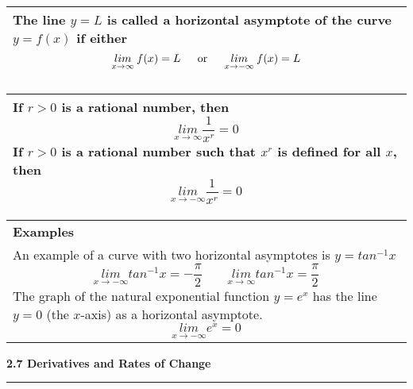 \documentclass[fleqn]{article}
\begin{document}
\begin{center}
\def\arraystretch{1.3}
{\setlength{\tabcolsep}{16pt}
\begin{tabularx}{.9\textwidth}{|X|}
\hline
	\vspace{1pt}
	The line $y = L$ is called a \textbf{horizontal asymptote} of the curve $y = f(x)$ if either
	$$\underset{x \to \infty}{lim} \: f(x) = L \text{\hspace{12pt} or \hspace{12pt}} \underset{x \to -\infty}{lim} \: f(x) = L$$
	\\
	\hline
\end{tabularx}}
\vspace{12pt}

\def\arraystretch{1.3}
{\setlength{\tabcolsep}{16pt}
\begin{tabularx}{.9\textwidth}{|X|}
\hline
	\vspace{1pt}
	If $r > 0$ is a rational number, then 
	$$\underset{x \to \infty}{lim} \dfrac{1}{x^r} = 0$$
	If $r > 0$ is a rational number such that $x^r$ is defined for all $x$, then
	$$\underset{x \to -\infty}{lim} \dfrac{1}{x^r} = 0$$	
	\\
	\hline
\end{tabularx}}
\vspace{12pt}

\def\arraystretch{1.3}
{\setlength{\tabcolsep}{16pt}
\begin{tabularx}{.9\textwidth}{|X|}
\hline
	\vspace{1pt}
	\textbf{Examples} \\
	An example of a curve with two horizontal asymptotes is $y = tan^{-1} x$
	$$\underset{x \to -\infty}{lim} tan^{-1} x = -\dfrac{\pi}{2} \hspace{24pt} \underset{x \to \infty}{lim} tan^{-1} x = \dfrac{\pi}{2}$$
	The graph of the natural exponential function $y = e^x$ has the line $y=0$ (the $x$-axis) as a horizontal asymptote.
	$$\underset{x \to -\infty}{lim} e^x = 0$$
	\\
	\hline
\end{tabularx}}
\vspace{12pt}

\Large\textbf{2.7 Derivatives and Rates of Change}

\noindent\hfill\rule{0.3\textwidth}{.4pt}\hfill
\vspace{12pt}


\end{center}
\end{document}
